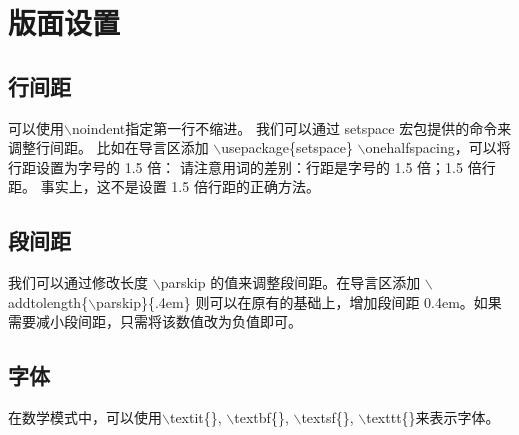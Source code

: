\section{版面设置}
\subsection{行间距}
\noindent 可以使用$\backslash$noindent指定第一行不缩进。
我们可以通过 setspace 宏包提供的命令来调整行间距。
比如在导言区添加
$\backslash$usepackage\{setspace\}
$\backslash$onehalfspacing，可以将行距设置为字号的 1.5 倍：
请注意用词的差别：行距是字号的 1.5 倍；1.5 倍行距。
事实上，这不是设置 1.5 倍行距的正确方法。
\subsection{段间距}
我们可以通过修改长度 $\backslash$parskip 的值来调整段间距。在导言区添加
$\backslash$addtolength\{$\backslash$parskip\}\{.4em\}
则可以在原有的基础上，增加段间距 0.4em。如果需要减小段间距，只需将该数值改为负值即可。
\subsection{字体}
在数学模式中，可以使用$\backslash$textit\{\}, $\backslash$textbf\{\}, 
$\backslash$textsf\{\}, $\backslash$texttt\{\}来表示字体。